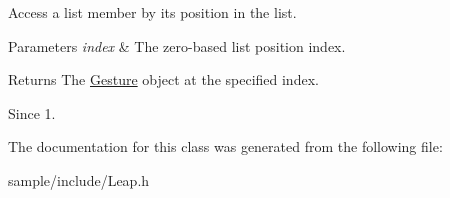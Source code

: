 Access a list member by its position in the list.


\begin{DoxyCodeInclude}
\end{DoxyCodeInclude}



\begin{DoxyParams}{Parameters}
{\em index} & The zero-\/based list position index. \\
\hline
\end{DoxyParams}
\begin{DoxyReturn}{Returns}
The \hyperlink{class_leap_1_1_gesture}{Gesture} object at the specified index. 
\end{DoxyReturn}
\begin{DoxySince}{Since}
1. 
\end{DoxySince}


The documentation for this class was generated from the following file\+:\begin{DoxyCompactItemize}
\item 
sample/include/Leap.\+h\end{DoxyCompactItemize}
